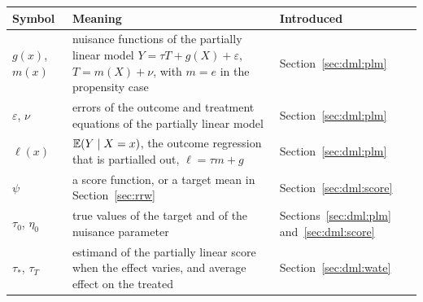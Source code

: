 {\noindent\small\centering
\setlength{\tabcolsep}{4pt}\renewcommand{\arraystretch}{1.1}
\begin{tabular}{>{\raggedright\arraybackslash}p{1.0in}>{\raggedright\arraybackslash}p{2.15in}>{\raggedright\arraybackslash}p{0.95in}}
\toprule
Symbol & Meaning & Introduced \\
\midrule
$g(x)$, $m(x)$ & nuisance functions of the partially linear model $Y = \tau T + g(X) + \varepsilon$, $T = m(X) + \nu$, with $m = e$ in the propensity case & Section~\ref{sec:dml:plm} \\
$\varepsilon$, $\nu$ & errors of the outcome and treatment equations of the partially linear model & Section~\ref{sec:dml:plm} \\
$\ell(x)$ & $\mathbb{E}(Y \mid X = x)$, the outcome regression that is partialled out, $\ell = \tau m + g$ & Section~\ref{sec:dml:plm} \\
$\psi$ & a score function, or a target mean in Section~\ref{sec:rrw} & Section~\ref{sec:dml:score} \\
$\tau_0$, $\eta_0$ & true values of the target and of the nuisance parameter & Sections~\ref{sec:dml:plm} and~\ref{sec:dml:score} \\
$\tau_*$, $\tau_T$ & estimand of the partially linear score when the effect varies, and average effect on the treated & Section~\ref{sec:dml:wate} \\
\end{tabular}\par}

